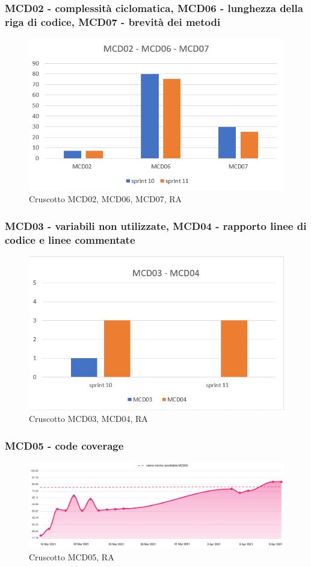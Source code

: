 \subsubsection*{MCD02 - complessità ciclomatica, MCD06 - lunghezza della riga di codice, MCD07 - brevità dei metodi}
\begin{figure}[H] 
    \centering
    \includegraphics[scale = 0.8]{immagini/MCD02-06-07-RA.png}
    \caption{Cruscotto MCD02, MCD06, MCD07, RA}
\end{figure}

\subsubsection*{MCD03 - variabili non utilizzate, MCD04 - rapporto linee di codice e linee commentate}
\begin{figure}[H] 
    \centering
    \includegraphics[scale = 0.8]{immagini/MCD03-04-RA.png}
    \caption{Cruscotto MCD03, MCD04, RA}
\end{figure}

\subsubsection*{MCD05 - code coverage}
\begin{figure}[H] 
    \centering
    \includegraphics[scale = 0.4]{immagini/MCD05.png}
    \caption{Cruscotto MCD05, RA}
\end{figure}


